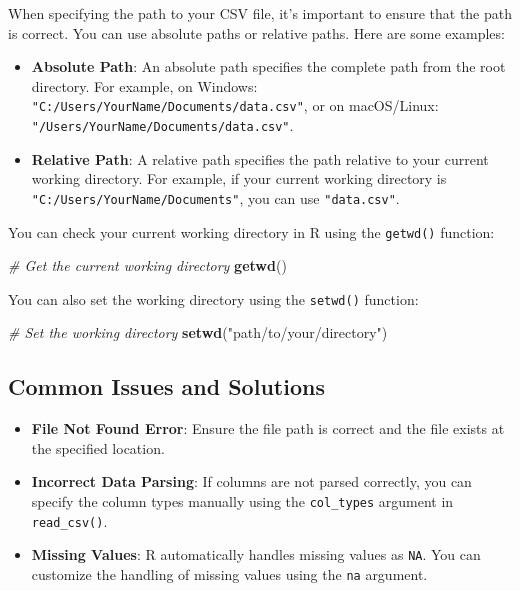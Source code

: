 \documentclass[
]{book}
\newenvironment{Shaded}{\begin{snugshade}}{\end{snugshade}}
\newcommand{\CommentTok}[1]{\textcolor[rgb]{0.56,0.35,0.01}{\textit{#1}}}
\newcommand{\FunctionTok}[1]{\textcolor[rgb]{0.13,0.29,0.53}{\textbf{#1}}}
\newcommand{\NormalTok}[1]{#1}
\newcommand{\StringTok}[1]{\textcolor[rgb]{0.31,0.60,0.02}{#1}}
\providecommand{\tightlist}{%
  \setlength{\itemsep}{0pt}\setlength{\parskip}{0pt}}
\begin{document}
When specifying the path to your CSV file, it's important to ensure that the path is correct. You can use absolute paths or relative paths. Here are some examples:

\begin{itemize}
\tightlist
\item
  \textbf{Absolute Path}: An absolute path specifies the complete path from the root directory. For example, on Windows: \texttt{"C:/Users/YourName/Documents/data.csv"}, or on macOS/Linux: \texttt{"/Users/YourName/Documents/data.csv"}.
\item
  \textbf{Relative Path}: A relative path specifies the path relative to your current working directory. For example, if your current working directory is \texttt{"C:/Users/YourName/Documents"}, you can use \texttt{"data.csv"}.
\end{itemize}

You can check your current working directory in R using the \texttt{getwd()} function:

\begin{Shaded}
\begin{Highlighting}[]
\CommentTok{\# Get the current working directory}
\FunctionTok{getwd}\NormalTok{()}
\end{Highlighting}
\end{Shaded}

You can also set the working directory using the \texttt{setwd()} function:

\begin{Shaded}
\begin{Highlighting}[]
\CommentTok{\# Set the working directory}
\FunctionTok{setwd}\NormalTok{(}\StringTok{"path/to/your/directory"}\NormalTok{)}
\end{Highlighting}
\end{Shaded}

\subsection{Common Issues and Solutions}\label{common-issues-and-solutions}

\begin{itemize}
\tightlist
\item
  \textbf{File Not Found Error}: Ensure the file path is correct and the file exists at the specified location.
\item
  \textbf{Incorrect Data Parsing}: If columns are not parsed correctly, you can specify the column types manually using the \texttt{col\_types} argument in \texttt{read\_csv()}.
\item
  \textbf{Missing Values}: R automatically handles missing values as \texttt{NA}. You can customize the handling of missing values using the \texttt{na} argument.
\end{itemize}
\end{document}
